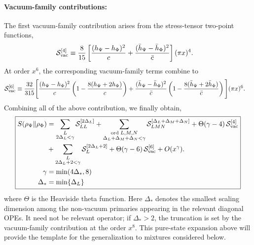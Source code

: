 \documentclass[11pt]{article}
\newcommand{\nn}{\nonumber}
\begin{document}
\paragraph{Vacuum-family contributions:}
The first vacuum-family contribution arises from the stress-tensor
two-point functions,
\begin{align}
    \mathcal S_{\rm vac}^{[4]}
    &\equiv
    \frac{8}{15}
    \left[
    \frac{(h_\Psi-h_\Phi)^2}{c}
    +
    \frac{(\bar h_\Psi-\bar h_\Phi)^2}{\bar c}
    \right]
    (\pi x)^4.
\end{align}
At order $x^6$, the corresponding vacuum-family terms combine to
\begin{align}
    \mathcal S_{\rm vac}^{[6]}
    &\equiv
    \frac{32}{315}
    \Bigg[
    \frac{(h_\Psi-h_\Phi)^2}{c}
    \left(
    1-\frac{8(h_\Psi+2h_\Phi)}{c}
    \right)
    +
    \frac{(\bar h_\Psi-\bar h_\Phi)^2}{\bar c}
    \left(
    1-\frac{8(\bar h_\Psi+2\bar h_\Phi)}{\bar c}
    \right)
    \Bigg]
    (\pi x)^6 .
\end{align}
Combining all of the above contribution, we finally obtain,
\begin{align}
\boxed{
\begin{aligned}
S(\rho_\Psi\|\rho_\Phi)
&=
\sum_{\substack{L\\2\Delta_L<\gamma}}
\mathcal S_{LL}^{[2\Delta_L]}
+
\sum_{\substack{{\rm ord}\;L,M,N\\
\Delta_L+\Delta_M+\Delta_N<\gamma}}
\mathcal S_{LMN}^{[\Delta_L+\Delta_M+\Delta_N]}+
\Theta(\gamma-4)\,
\mathcal S_{\rm vac}^{[4]}
\nn\\&+
\sum_{\substack{L\\2\Delta_L+2<\gamma}}
\mathcal S_L^{[2\Delta_L+2]}+
\Theta(\gamma-6)\,
\mathcal S_{\rm vac}^{[6]}
+
O(x^\gamma).\\
\gamma &= \min (4\Delta_*,8)\\
\Delta_* &= \min \{\Delta_L\}
\end{aligned}}
\end{align}
where $\Theta$ is the Heaviside theta function.
Here $\Delta_*$ denotes the smallest scaling dimension among the
non-vacuum primaries appearing in the relevant diagonal OPEs. It need not be relevant operator; if $\Delta_*>2$, the truncation is set by the vacuum-family contribution at the order $x^8$.
This pure-state
expansion above will provide the template for the generalization to
mixtures considered below.
\end{document}
